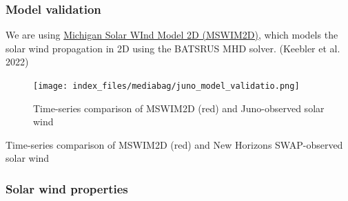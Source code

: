 \documentclass[
  letterpaper,
  DIV=11,
  numbers=noendperiod,
  oneside]{scrartcl}
\begin{document}
\subsubsection{Model validation}\label{model-validation}

We are using \href{http://csem.engin.umich.edu/MSWIM2D/}{Michigan Solar
WInd Model 2D (MSWIM2D)}, which models the solar wind propagation in 2D
using the BATSRUS MHD solver. (Keebler et al. 2022)

\begin{figure}[H]

{\centering \texttt{[image: index\_files/mediabag/juno\_model\_validatio.png]}

}

\caption{Time-series comparison of MSWIM2D (red) and Juno-observed solar
wind}

\end{figure}%
\begin{marginfigure}

{

}

\caption{Time-series comparison of MSWIM2D (red) and New Horizons
SWAP-observed solar wind}

\end{marginfigure}%

\subsubsection{Solar wind properties}\label{solar-wind-properties}
\end{document}
